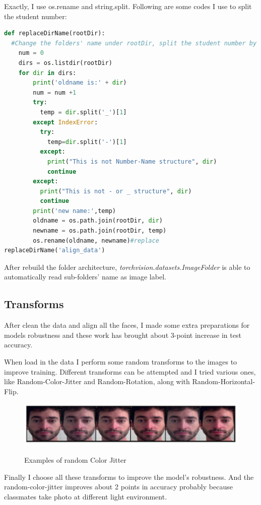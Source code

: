 \documentclass{article}
\begin{document}
Exactly, I use os.rename and string.split. Following are some codes I use to split the student number:

\begin{lstlisting}[language=Python, caption=Change folder names for ImageFloder function]
def replaceDirName(rootDir):
  #Change the folders' name under rootDir, split the student number by '-' or '_'
    num = 0
    dirs = os.listdir(rootDir)
    for dir in dirs:
        print('oldname is:' + dir)
        num = num +1
        try:
          temp = dir.split('_')[1]
        except IndexError:
          try:
            temp=dir.split('-')[1]
          except:
            print("This is not Number-Name structure", dir)
            continue
        except:
          print("This is not - or _ structure", dir)
          continue
        print('new name:',temp)
        oldname = os.path.join(rootDir, dir)
        newname = os.path.join(rootDir, temp)
        os.rename(oldname, newname)#replace
replaceDirName('align_data')
\end{lstlisting}




After rebuild the folder architecture, \textit{torchvision.datasets.ImageFolder} is able to automatically read sub-folders' name as image label. 

\subsection{Transforms}
After clean the data and align all the faces, I made some extra preparations for models robustness and these work has brought about 3-point increase in test accuracy.

When load in the data I perform some random transforms to the images to improve training. Different transforms can be attempted and I tried various ones, like Random-Color-Jitter and Random-Rotation, along with Random-Horizontal-Flip.
\begin{figure}[H]%
  \centering
  \caption{Examples of random Color Jitter}
  \includegraphics[width=\columnwidth]{IMG/随机彩色.png} %
  \label{Fig.RNN} %
\end{figure}
Finally I choose all these transforms to improve the model's robustness. And the random-color-jitter improves about 2 points in accuracy probably because classmates take photo at different light environment.
\end{document}
